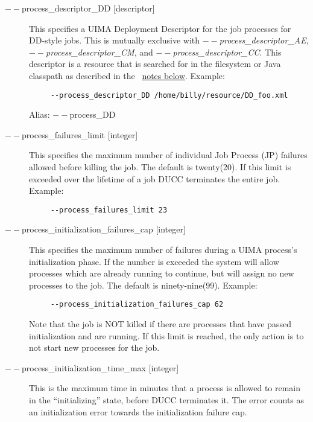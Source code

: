 \begin{description}
           \item[$--$process\_descriptor\_DD {[descriptor]}  ]
             This specifies a UIMA Deployment Descriptor for the job processes for DD-style jobs. 
             This is mutually exclusive with {\em $--$process\_descriptor\_AE}, {\em $--$process\_descriptor\_CM}, 
             and {\em $--$process\_descriptor\_CC}. This 
             descriptor is a resource that is searched for in the filesystem or Java classpath as described 
             in the ~\hyperref[par:cli.submit.notes]{notes below}.
             Example:
             \begin{verbatim}
     --process_descriptor_DD /home/billy/resource/DD_foo.xml
             \end{verbatim}
             Alias: $--$process\_DD

           \item[$--$process\_failures\_limit {[integer]} ]
             This specifies the maximum number of individual Job Process (JP) failures allowed
             before killing the job. The default is twenty(20). If this limit is exceeded over the lifetime 
             of a job DUCC terminates the entire job. 
             Example:
             \begin{verbatim}
     --process_failures_limit 23
             \end{verbatim}
                          
           \item[$--$process\_initialization\_failures\_cap {[integer]} ] This specifies the maximum
             number of failures during a UIMA process's initialization phase.  If the number is
             exceeded the system will allow processes which are already running to continue, but
             will assign no new processes to the job.  The default is ninety-nine(99). Example:
             \begin{verbatim}
     --process_initialization_failures_cap 62
             \end{verbatim}
             Note that the job is NOT killed if there are processes that have passed initialization and are 
             running. If this limit is reached, the only action is to not start new processes for the job. 

           \item[$--$process\_initialization\_time\_max {[integer]}] This is the maximum time in minutes that 
             a process is allowed to remain in the ``initializing'' state, before DUCC terminates it.  The 
             error counts as an initialization error towards the initialization failure cap.


\end{description}
